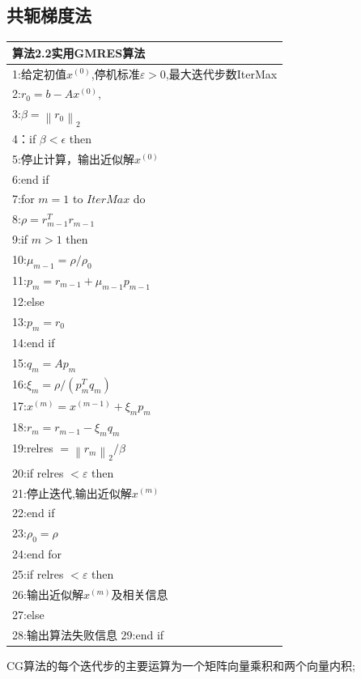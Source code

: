 \documentclass[12pt,a4paper]{article}
\begin{document}
\subsection*{共轭梯度法}
\begin{tabular}{l}
	\hline
	{\color{blue}算法2.2}实用GMRES算法\\
	\hline
	1:给定初值$x^{(0)}$,停机标准$\varepsilon>0$,最大迭代步数IterMax\\
	2:$r_{0}=b-A x^{(0)},$\\
	3:$\beta=\left\|r_{0}\right\|_{2}$\\
	4：if $\beta< \epsilon$ then\\
	5:\qquad 停止计算，输出近似解$x^{(0)}$\\
	6:end if\\
	7:for $m=1$ to $IterMax$ do\\
	8:\qquad $\rho=r_{m-1}^{T} r_{m-1}$\\
	9:\qquad if $m>1$ then\\
	10:\qquad \qquad $\mu_{m-1}=\rho / \rho_{0}$\\
	11:\qquad \qquad $p_{m}=r_{m-1}+\mu_{m-1} p_{m-1}$\\
	12:\qquad else\\
	13:\qquad \qquad $p_{m}=r_{0}$\\
	14:\qquad end if\\
	15:\qquad $q_{m}=A p_{m}$\\
	16:\qquad $\xi_{m}=\rho /\left(p_{m}^{T} q_{m}\right)$\\
	17:\qquad $x^{(m)}=x^{(m-1)}+\xi_{m} p_{m}$\\
	18:\qquad $r_{m}=r_{m-1}-\xi_{m} q_{m}$\\
	19:\qquad relres $=\left\|r_{m}\right\|_{2} / \beta$\\
	20:\qquad if relres $<\varepsilon$ then\\
	21:\qquad \qquad 停止迭代,输出近似解$x^{(m)}$\\
	22:\qquad end if\\
	23:\qquad $\rho_{0}=\rho$\\
	24:end for\\
	25:if relres $<\varepsilon$ then\\
	26:\qquad 输出近似解$x^{(m)}$及相关信息\\
	27:else\\
	28:\qquad 输出算法失败信息
	29:end if\\
	\hline
\end{tabular}
CG算法的每个迭代步的主要运算为一个矩阵向量乘积和两个向量内积;\\
\end{document}
